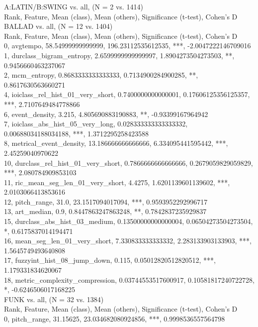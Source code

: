 A:LATIN/B:SWING vs. all, (N = 2 vs. 1414)\\
Rank, Feature, Mean (class), Mean (others), Significance (t-test), Cohen's D\\
BALLAD vs. all, (N = 12 vs. 1404)\\
Rank, Feature, Mean (class), Mean (others), Significance (t-test), Cohen's D\\
0, avgtempo, 58.54999999999999, 196.23112535612535, ***, -2.0047222146709016\\
1, durclass_bigram_entropy, 2.6599999999999997, 1.8904273504273503, **, 0.9456660463237067\\
2, mcm_entropy, 0.8683333333333333, 0.7134900284900285, **, 0.8617630563660271\\
4, ioiclass_rel_hist_01_very_short, 0.7400000000000001, 0.17606125356125357, ***, 2.7107649484778866\\
6, event_density, 3.215, 4.805690883190883, **, -0.93399167964942\\
7, ioiclass_abs_hist_05_very_long, 0.028333333333333332, 0.00688034188034188, ***, 1.3712295258423588\\
8, metrical_event_density, 13.186666666666666, 6.334095441595442, ***, 2.45259040970622\\
10, durclass_rel_hist_01_very_short, 0.7866666666666666, 0.2679059829059829, ***, 2.080784909853103\\
11, ric_mean_seg_len_01_very_short, 4.4275, 1.6201139601139602, ***, 2.0103066413853616\\
12, pitch_range, 31.0, 23.1517094017094, ***, 0.9593952292996717\\
13, art_median, 0.9, 0.8447863247863248, **, 0.7842837235929837\\
15, durclass_abs_hist_03_medium, 0.13500000000000004, 0.06504273504273504, *, 0.6175837014194471\\
16, mean_seg_len_01_very_short, 7.330833333333332, 2.283133903133903, ***, 1.5645749493640808\\
17, fuzzyint_hist_08_jump_down, 0.115, 0.05012820512820512, ***, 1.179331834620067\\
18, metric_complexity_compression, 0.03744553517600917, 0.10581817240722728, *, -0.6246506017168225\\
FUNK vs. all, (N = 32 vs. 1384)\\
Rank, Feature, Mean (class), Mean (others), Significance (t-test), Cohen's D\\
0, pitch_range, 31.15625, 23.034682080924856, ***, 0.9998536557564798\\
